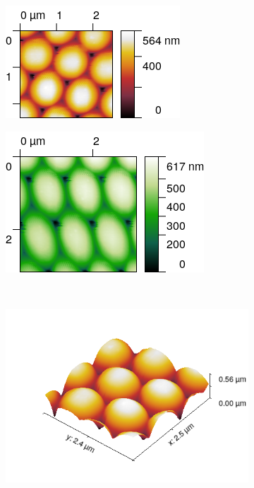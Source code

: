 \documentclass[11pt,a4paper]{article}
\begin{document}
\begin{figure}[H]
\centering
\begin{subfigure}[b]{0.45\textwidth}
\includegraphics[width=\textwidth]{sm_sample1}
\caption{}
\label{fig:sample1_first_tip}
\end{subfigure}
\begin{subfigure}[b]{0.45\textwidth}
\includegraphics[width=\textwidth]{sm_sample1_dir2}
\caption{}
\label{fig:sample1_second_tip}
\end{subfigure}\\\vspace{.2cm}
\begin{subfigure}[b]{0.45\textwidth}
\includegraphics[width=\textwidth]{sm_sample1_3D}

\end{subfigure}
\end{figure}
\end{document}
